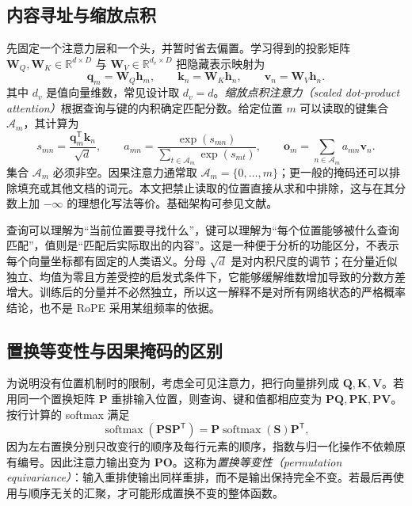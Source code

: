 \documentclass[UTF8,12pt,a4paper,fontset=fandol]{ctexart}
\begin{document}
\subsection{内容寻址与缩放点积}
先固定一个注意力层和一个头，并暂时省去偏置。学习得到的投影矩阵 $\mathbf W_Q,\mathbf W_K\in\mathbb R^{d\times D}$ 与 $\mathbf W_V\in\mathbb R^{d_v\times D}$ 把隐藏表示映射为
\begin{equation}
\mathbf q_m=\mathbf W_Q\mathbf h_m,\qquad
\mathbf k_n=\mathbf W_K\mathbf h_n,\qquad
\mathbf v_n=\mathbf W_V\mathbf h_n.
\label{eq:rope-qkv}
\end{equation}
其中 $d_v$ 是值向量维数，常见设计取 $d_v=d$。\emph{缩放点积注意力（scaled dot-product attention）}根据查询与键的内积确定匹配分数。给定位置 $m$ 可以读取的键集合 $\mathcal A_m$，其计算为
\begin{equation}
s_{mn}=\frac{\mathbf q_m^{\mathsf T}\mathbf k_n}{\sqrt d},\qquad
a_{mn}=\frac{\exp(s_{mn})}{\sum_{t\in\mathcal A_m}\exp(s_{mt})},\qquad
\mathbf o_m=\sum_{n\in\mathcal A_m}a_{mn}\mathbf v_n.
\label{eq:rope-attention}
\end{equation}
集合 $\mathcal A_m$ 必须非空。因果注意力通常取 $\mathcal A_m=\{0,\ldots,m\}$；更一般的掩码还可以排除填充或其他文档的词元。本文把禁止读取的位置直接从求和中排除，这与在其分数上加 $-\infty$ 的理想化写法等价。基础架构可参见文献\cite{vaswani2017}。

查询可以理解为“当前位置要寻找什么”，键可以理解为“每个位置能够被什么查询匹配”，值则是“匹配后实际取出的内容”。这是一种便于分析的功能区分，不表示每个向量坐标都有固定的人类语义。分母 $\sqrt d$ 是对内积尺度的调节；在分量近似独立、均值为零且方差受控的启发式条件下，它能够缓解维数增加导致的分数方差增大。训练后的分量并不必然独立，所以这一解释不是对所有网络状态的严格概率结论，也不是 RoPE 采用某组频率的依据。

\subsection{置换等变性与因果掩码的区别}
为说明没有位置机制时的限制，考虑全可见注意力，把行向量排列成 $\mathbf Q,\mathbf K,\mathbf V$。若用同一个置换矩阵 $\mathbf P$ 重排输入位置，则查询、键和值都相应变为 $\mathbf P\mathbf Q,\mathbf P\mathbf K,\mathbf P\mathbf V$。按行计算的 softmax 满足
\[
\operatorname{softmax}(\mathbf P\mathbf S\mathbf P^{\mathsf T})
=\mathbf P\operatorname{softmax}(\mathbf S)\mathbf P^{\mathsf T},
\]
因为左右置换分别只改变行的顺序及每行元素的顺序，指数与归一化操作不依赖原有编号。因此注意力输出变为 $\mathbf P\mathbf O$。这称为\emph{置换等变性（permutation equivariance）}：输入重排使输出同样重排，而不是输出保持完全不变。若最后再使用与顺序无关的汇聚，才可能形成置换不变的整体函数。
\end{document}
